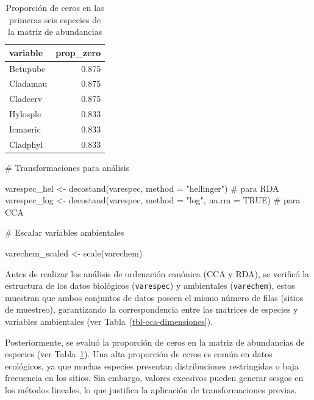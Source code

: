 \documentclass[
  spanish,
  11pt,
  a4paper,
  DIV=11,
  numbers=noendperiod]{scrartcl}
\newenvironment{Shaded}{\begin{snugshade}}{\end{snugshade}}
\newcommand{\AttributeTok}[1]{\textcolor[rgb]{0.40,0.45,0.13}{#1}}
\newcommand{\CommentTok}[1]{\textcolor[rgb]{0.37,0.37,0.37}{#1}}
\newcommand{\ConstantTok}[1]{\textcolor[rgb]{0.56,0.35,0.01}{#1}}
\newcommand{\FunctionTok}[1]{\textcolor[rgb]{0.28,0.35,0.67}{#1}}
\newcommand{\NormalTok}[1]{\textcolor[rgb]{0.00,0.23,0.31}{#1}}
\newcommand{\OtherTok}[1]{\textcolor[rgb]{0.00,0.23,0.31}{#1}}
\newcommand{\StringTok}[1]{\textcolor[rgb]{0.13,0.47,0.30}{#1}}
\begin{document}
\begin{longtable}[]{@{}lr@{}}

\caption{\label{tbl-cca-ceros}Proporción de ceros en las primeras seis
especies de la matriz de abundancias}

\tabularnewline

\toprule\noalign{}
variable & prop\_zero \\
\midrule\noalign{}
\endhead
\bottomrule\noalign{}
\endlastfoot
Betupube & 0.875 \\
Cladamau & 0.875 \\
Cladcerv & 0.875 \\
Hylosple & 0.833 \\
Icmaeric & 0.833 \\
Cladphyl & 0.833 \\

\end{longtable}

\begin{Shaded}
\begin{Highlighting}[numbers=left,,]
\CommentTok{\# Transformaciones para análisis}

\NormalTok{varespec\_hel }\OtherTok{\textless{}{-}} \FunctionTok{decostand}\NormalTok{(varespec, }\AttributeTok{method =} \StringTok{"hellinger"}\NormalTok{)  }\CommentTok{\# para RDA}
\NormalTok{varespec\_log  }\OtherTok{\textless{}{-}} \FunctionTok{decostand}\NormalTok{(varespec, }\AttributeTok{method =} \StringTok{"log"}\NormalTok{, }\AttributeTok{na.rm =} \ConstantTok{TRUE}\NormalTok{)  }\CommentTok{\# para CCA}

\CommentTok{\#  Escalar variables ambientales}

\NormalTok{varechem\_scaled }\OtherTok{\textless{}{-}} \FunctionTok{scale}\NormalTok{(varechem)}
\end{Highlighting}
\end{Shaded}

Antes de realizar los análisis de ordenación canónica (CCA y RDA), se
verificó la estructura de los datos biológicos (\texttt{varespec}) y
ambientales (\texttt{varechem}), estos muestran que ambos conjuntos de
datos poseen el mismo número de filas (sitios de muestreo), garantizando
la correspondencia entre las matrices de especies y variables
ambientales (ver Tabla~\ref{tbl-cca-dimensiones}).

Posteriormente, se evaluó la proporción de ceros en la matriz de
abundancias de especies (ver Tabla~\ref{tbl-cca-ceros}). Una alta
proporción de ceros es común en datos ecológicos, ya que muchas especies
presentan distribuciones restringidas o baja frecuencia en los sitios.
Sin embargo, valores excesivos pueden generar sesgos en los métodos
lineales, lo que justifica la aplicación de transformaciones previas.
\end{document}
